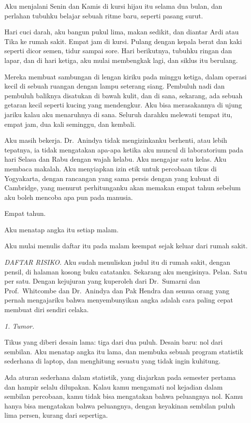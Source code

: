 \documentclass[11pt,twoside,openany]{book}
\makeatletter
\newcommand{\scenebreak}{\par\vspace{0.9em}{\centering\textsc{*\hspace{0.7em}*\hspace{0.7em}*}\par}\vspace{0.9em}\@afterindentfalse\@afterheading}
\makeatother
\begin{document}
\scenebreak
Aku menjalani Senin dan Kamis di kursi hijau itu selama dua bulan, dan perlahan tubuhku belajar sebuah ritme baru, seperti pasang surut.

Hari cuci darah, aku bangun pukul lima, makan sedikit, dan diantar Ardi atau Tika ke rumah sakit. Empat jam di kursi. Pulang dengan kepala berat dan kaki seperti dicor semen, tidur sampai sore. Hari berikutnya, tubuhku ringan dan lapar, dan di hari ketiga, aku mulai membengkak lagi, dan siklus itu berulang.

Mereka membuat sambungan di lengan kiriku pada minggu ketiga, dalam operasi kecil di sebuah ruangan dengan lampu seterang siang. Pembuluh nadi dan pembuluh baliknya disatukan di bawah kulit, dan di sana, sekarang, ada sebuah getaran kecil seperti kucing yang mendengkur. Aku bisa merasakannya di ujung jariku kalau aku menaruhnya di sana. Seluruh darahku melewati tempat itu, empat jam, dua kali seminggu, dan kembali.

Aku masih bekerja. Dr.~Anindya tidak mengizinkanku berhenti, atau lebih tepatnya, ia tidak mengatakan apa-apa ketika aku muncul di laboratorium pada hari Selasa dan Rabu dengan wajah kelabu. Aku mengajar satu kelas. Aku membaca makalah. Aku menyiapkan izin etik untuk percobaan tikus di Yogyakarta, dengan rancangan yang sama persis dengan yang kubuat di Cambridge, yang menurut perhitunganku akan memakan empat tahun sebelum aku boleh mencoba apa pun pada manusia.

Empat tahun.

Aku menatap angka itu setiap malam.

\scenebreak
Aku mulai menulis daftar itu pada malam keempat sejak keluar dari rumah sakit.

\emph{DAFTAR RISIKO.} Aku sudah menuliskan judul itu di rumah sakit, dengan pensil, di halaman kosong buku catatanku. Sekarang aku mengisinya. Pelan. Satu per satu. Dengan kejujuran yang kuperoleh dari Dr.~Sumarni dan Prof.~Whitcombe dan Dr.~Anindya dan Pak Hendra dan semua orang yang pernah mengajariku bahwa menyembunyikan angka adalah cara paling cepat membuat diri sendiri celaka.

\emph{1. Tumor.}

Tikus yang diberi desain lama: tiga dari dua puluh. Desain baru: nol dari sembilan. Aku menatap angka itu lama, dan membuka sebuah program statistik sederhana di laptop, dan menghitung sesuatu yang tidak ingin kuhitung.

Ada aturan sederhana dalam statistik, yang diajarkan pada semester pertama dan hampir selalu dilupakan. Kalau kamu mengamati nol kejadian dalam sembilan percobaan, kamu tidak bisa mengatakan bahwa peluangnya nol. Kamu hanya bisa mengatakan bahwa peluangnya, dengan keyakinan sembilan puluh lima persen, kurang dari sepertiga.
\end{document}
